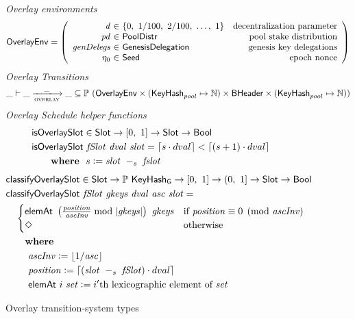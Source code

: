 \begin{figure}
  \emph{Overlay environments}
  \begin{equation*}
    \OverlayEnv =
    \left(
      \begin{array}{r@{~\in~}lr}
        \var{d} & \{0,~1/100,~2/100,~\ldots,~1\} & \text{decentralization parameter} \\
        \var{pd} & \PoolDistr & \text{pool stake distribution} \\
        \var{genDelegs} & \GenesisDelegation & \text{genesis key delegations} \\
        \eta_0 & \Seed & \text{epoch nonce} \\
      \end{array}
    \right)
  \end{equation*}
  \emph{Overlay Transitions}
  \begin{equation*}
    \_ \vdash \var{\_} \trans{overlay}{\_} \var{\_} \subseteq
    \powerset (\OverlayEnv \times (\KeyHash_{pool} \mapsto \N) \times \BHeader \times
    (\KeyHash_{pool} \mapsto \N))
  \end{equation*}
  \emph{Overlay Schedule helper functions}
  \begin{align*}
      & \mathsf{isOverlaySlot} \in \mathsf{Slot} \to [0,~1] \to \mathsf{Slot} \to \mathsf{Bool} \\
      & \mathsf{isOverlaySlot}~\mathit{fSlot}~\mathit{dval}~\mathit{slot} = \lceil s\cdot dval \rceil < \lceil (s+1)\cdot dval \rceil \\
      & ~~~~ ~ ~ \mathbf{where}~ ~  s\mathrel{\mathop:}=\mathit{slot}~-_{s}~\mathit{fslot}
  \end{align*}
  \begin{align*}
      & \mathsf{classifyOverlaySlot} \in \mathsf{Slot} \to \mathbb{P}~\mathsf{KeyHash_G} \to [0,~1]
        \to (0,~1] \to \mathsf{Slot} \to \mathsf{Bool} \\
      & \mathsf{classifyOverlaySlot}~\mathit{fSlot}~\mathit{gkeys}~\mathit{dval}~\mathit{asc}~\mathit{slot} = \\
      & ~~~\begin{cases}
        \mathsf{elemAt}~\left( \frac{\mathit{position}}{\mathit{ascInv}} \bmod |\mathit{gkeys}| \right)~\mathit{gkeys}
        &
        \text{if } \mathit{position} \equiv 0 \pmod{\mathit{ascInv}} \\
        \Diamond
        &
        \text{otherwise}
        \end{cases} \\
      & ~~~~ ~ ~ \mathbf{where}~ ~  \\
      & ~~~~~~~ \mathit{ascInv}\mathrel{\mathop:}=\lfloor 1/\mathit{asc}\rfloor \\
      & ~~~~~~~ \mathit{position}\mathrel{\mathop:}= \lceil (\mathit{slot}~-_{s}~\mathit{fSlot})\cdot dval \rceil \\
      & ~~~~~~~ \mathsf{elemAt}~i~\mathit{set}\mathrel{\mathop:}= i'\text{th lexicographic element of }\mathit{set}
  \end{align*}
  \caption{Overlay transition-system types}
  \label{fig:ts-types:overlay}
\end{figure}

